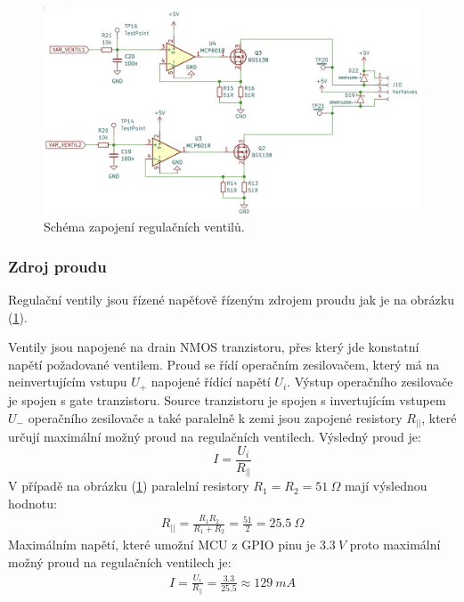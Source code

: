 \begin{figure}[H]
    \includegraphics[width=1\linewidth]{pictures/var_valves.jpg}
    \caption{Schéma zapojení regulačních ventilů.}
    \label{fig:variable_valve_driver}
\end{figure}

\subsubsection{Zdroj proudu}
Regulační ventily jsou řízené napěťově řízeným zdrojem proudu jak je na obrázku (\ref{fig:variable_valve_driver}).\par
Ventily jsou napojené na drain NMOS tranzistoru, přes který jde konstatní napětí požadované ventilem. Proud se řídí operačním zesilovačem, který má na neinvertujícím vstupu $U_+$ napojené řídící napětí $U_i$. Výstup operačního zesilovače je spojen s gate tranzistoru. Source tranzistoru je spojen s invertujícím vstupem $U_-$ operačního zesilovače a také paralelně k zemi jsou zapojené resistory $R_{||}$, které určují maximální možný proud na regulačních ventilech. Výsledný proud je:
\begin{equation}
    \label{eq:current_source}
    I = \frac{U_i}{R_{||}}
\end{equation}
V případě na obrázku (\ref{fig:variable_valve_driver}) paralelní resistory $R_1 = R_2 = 51 \ \Omega$ mají výslednou hodnotu:
\begin{align*}
    R_{||} = \frac{R_1 R_2}{R_1 + R_2} = \frac{51}{2} = 25.5 \ \Omega
\end{align*}
Maximálním napětí, které umožní MCU z GPIO pinu je $3.3 \ V$ proto maximální možný proud na regulačních ventilech je:
\begin{align*}
    I = \frac{U_i}{R_{||}} = \frac{3.3}{25.5} \approx 129 \ mA
\end{align*}

